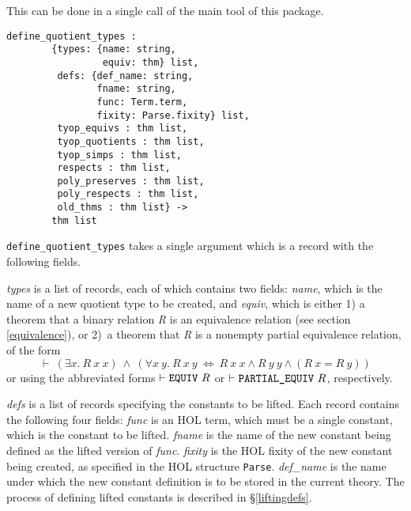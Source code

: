 \documentclass[envcountsame,runningheads]{llncs}
\begin{document}
This can be done in a single call of the
main tool of this package. 

\begin{verbatim}
define_quotient_types : 
        {types: {name: string,
                 equiv: thm} list,
         defs: {def_name: string,
                fname: string,
                func: Term.term,
                fixity: Parse.fixity} list,
         tyop_equivs : thm list,
         tyop_quotients : thm list,
         tyop_simps : thm list,
         respects : thm list,
         poly_preserves : thm list,
         poly_respects : thm list,
         old_thms : thm list} ->
        thm list
\end{verbatim}

{\tt define\_quotient\_types} takes a single argument which is a
record with the following fields.

{\it types\/} is a list of records, each of which contains two fields:
{\it name}, which is the name of a new quotient type to be created, and 
{\it equiv}, which is
either 1)
a theorem that a binary relation {\it R\/}
is an equivalence relation
(see section \ref{equivalence}),
or 2)\ a theorem that {\it R\/} is a nonempty partial equivalence relation,
of the form
$$
\vdash\ 
(\exists x.\ R\ x\ x) \ \wedge \ 
(\forall x\ y.\ R\ x\ y \ \Leftrightarrow \ 
                R\ x\ x \wedge R\ y\ y \wedge (R\ x = R\ y))
$$
%
\noindent
or using the abbreviated forms
$\vdash \mbox{\tt EQUIV}\ R$
or
$\vdash \mbox{\tt PARTIAL\_EQUIV}\ R$, respectively.

{\it defs\/} is a list of records specifying the constants to be lifted.
Each record contains the following four fields:
{\it func\/} is an HOL term, which must be a single constant, which is the 
constant to be lifted.
{\it fname\/} is the name of the new constant being defined as the lifted version of {\it func}.
{\it fixity\/} is the HOL fixity of the new constant being created,
as specified in the HOL structure {\tt Parse}.
{\it def\_name} is the name under which the new constant definition is to 
be stored in the current theory.
The
process of defining lifted constants
is described in
\S\ref{liftingdefs}.
\end{document}
